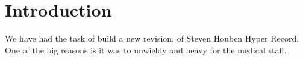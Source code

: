 \section{Introduction}
We have had the task of build a new revision, of Steven Houben Hyper Record.
One of the big reasons is it was to unwieldy and heavy for the medical staff.
